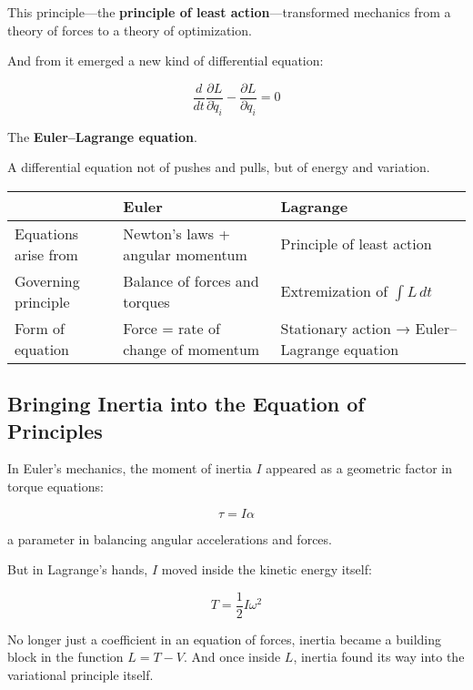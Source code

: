 This principle—the \textbf{principle of least action}—transformed mechanics from a theory of forces to a theory of optimization.

And from it emerged a new kind of differential equation:

\[
\frac{d}{dt} \frac{\partial L}{\partial \dot{q}_i} - \frac{\partial L}{\partial q_i} = 0
\]

The \textbf{Euler–Lagrange equation}.

A differential equation not of pushes and pulls, but of energy and variation.

\bigskip

\begin{tcolorbox}[colback=gray!5!white, colframe=black, title=\textbf{Sidebar: The Shift from Euler to Lagrange}, fonttitle=\bfseries, arc=1.5mm, boxrule=0.4pt]

\begin{tabular}{>{\raggedright}p{3.5cm} >{\raggedright}p{5.5cm} >{\raggedright\arraybackslash}p{5.5cm}}
 & \textbf{Euler} & \textbf{Lagrange} \\
\midrule
Equations arise from & Newton’s laws + angular momentum & Principle of least action \\
Governing principle & Balance of forces and torques & Extremization of \( \int L \, dt \) \\
Form of equation & Force = rate of change of momentum & Stationary action → Euler–Lagrange equation
\end{tabular}

\end{tcolorbox}

\bigskip

\subsection*{Bringing Inertia into the Equation of Principles}

In Euler’s mechanics, the moment of inertia \( I \) appeared as a geometric factor in torque equations:

\[
\tau = I \alpha
\]

a parameter in balancing angular accelerations and forces.

But in Lagrange’s hands, \( I \) moved inside the kinetic energy itself:

\[
T = \frac{1}{2} I \omega^2
\]

No longer just a coefficient in an equation of forces, inertia became a building block in the function \( L = T - V \).  
And once inside \( L \), inertia found its way into the variational principle itself.

